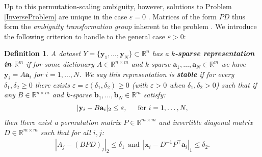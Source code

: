 \documentclass[journal, twocolumn]{IEEEtran}
\newtheorem{definition}{Definition}
\begin{document}
Up to this permutation-scaling ambiguity, however, solutions to Problem \ref{InverseProblem} are unique in the case $\varepsilon = 0$ \cite{Georgiev05, Aharon06, Hillar15}. Matrices of the form $PD$ thus form the \emph{ambiguity transformation group} inherent to the problem \cite{Li15}. We introduce the following criterion to handle to the general case $\varepsilon > 0$:

\begin{definition}\label{Uniqueness}
A dataset $Y = \{\mathbf{y}_1, \ldots, \mathbf{y}_N\} \subset \mathbb{R}^n$ has a \textbf{$k$-sparse representation in $\mathbb{R}^m$} if for some dictionary $A \in \mathbb{R}^{n \times m}$ and $k$-sparse $\mathbf{a}_1, \ldots, \mathbf{a}_N \in \mathbb{R}^m$ we have $\mathbf{y}_i = A\mathbf{a}_i$ for $i = 1, \ldots, N$. We say this representation is \textbf{stable} if for every $\delta_1, \delta_2 \geq 0$ there exists $\varepsilon = \varepsilon(\delta_1, \delta_2) \geq 0$ (with $\varepsilon > 0$ when  $\delta_1, \delta_2 > 0$) such that if any $B \in \mathbb{R}^{n \times m}$ and $k$-sparse $\mathbf{b}_1, \ldots, \mathbf{b}_N \in \mathbb{R}^m$ satisfy:
\begin{align}\label{y-Bb}
|\mathbf{y}_i - B\mathbf{a}_i|_2 \leq \varepsilon,\indent \text{for } i = 1, \ldots, N,
\end{align}
%
then there exist a permutation matrix $P \in \mathbb{R}^{m \times m}$ and invertible diagonal matrix $D \in \mathbb{R}^{m \times m}$ such that for all $i,j$:
\begin{align}\label{def1}
|A_j - (BPD)_j|_2 \leq \delta_1 \ \ \text{and} \ \ |\mathbf{x}_i - D^{-1}P^{\top}\mathbf{a}_i|_1 \leq \delta_2.
\end{align}
\end{definition}
\end{document}
